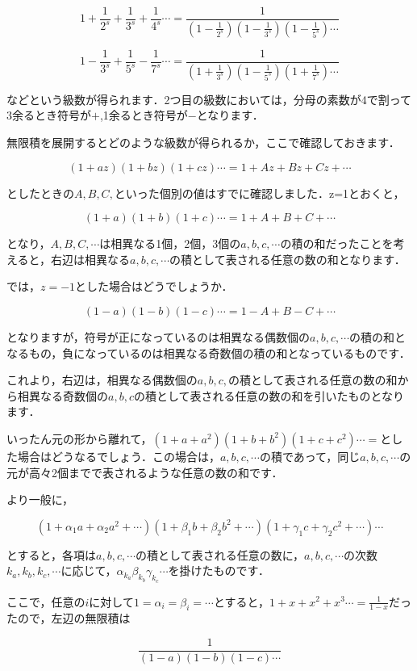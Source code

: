 \documentclass[./main]{subfiles}
\theoremstyle{break}
\begin{document}
\[1+\frac{1}{2^s}+\frac{1}{3^s}+\frac{1}{4^s}\cdots =\frac{1}{\left( 1-\frac{1}{2^s} \right)\left( 1-\frac{1}{3^s} \right)\left( 1-\frac{1}{5^s} \right)\cdots}\]

\[1-\frac{1}{3^s}+\frac{1}{5^s}-\frac{1}{7^s}\cdots =\frac{1}{\left( 1+\frac{1}{3^s} \right)\left( 1-\frac{1}{5^s} \right)\left( 1+\frac{1}{7^s} \right)\cdots}\]

などという級数が得られます．2つ目の級数においては，分母の素数が4で割って3余るとき符号が$+$,1余るとき符号が$-$となります．

無限積を展開するとどのような級数が得られるか，ここで確認しておきます．

\[(1+az)(1+bz)(1+cz)\cdots=1+Az+Bz+Cz+\cdots\]

としたときの$A,B,C,$といった個別の値はすでに確認しました．z=1とおくと，

\[(1+a)(1+b)(1+c)\cdots=1+A+B+C+\cdots\]

となり，$A,B,C,\cdots$は相異なる1個，2個，3個の$a,b,c,\cdots$の積の和だったことを考えると，右辺は相異なる$a,b,c,\cdots$の積として表される任意の数の和となります．

では，$z=-1$とした場合はどうでしょうか．

\[(1-a)(1-b)(1-c)\cdots=1-A+B-C+\cdots\]

となりますが，符号が正になっているのは相異なる偶数個の$a,b,c,\cdots$の積の和となるもの，負になっているのは相異なる奇数個の積の和となっているものです．

これより，右辺は，相異なる偶数個の$a,b,c,$の積として表される任意の数の和から相異なる奇数個の$a,b,c$の積として表される任意の数の和を引いたものとなります．

いったん元の形から離れて，$(1+a+a^2)(1+b+b^2)(1+c+c^2)\cdots=$とした場合はどうなるでしょう．この場合は，$a,b,c,\cdots$の積であって，同じ$a,b,c,\cdots$の元が高々2個までで表されるような任意の数の和です．

より一般に，

\[(1+\alpha_1a+\alpha_2a^2+\cdots)(1+\beta_1b+\beta_2b^2+\cdots)(1+\gamma_1c+\gamma_2c^2+\cdots)\cdots\]

とすると，各項は$a,b,c,\cdots$の積として表される任意の数に，$a,b,c,\cdots$の次数$k_a,k_b,k_c,\cdots$に応じて，$\alpha_{k_a}\beta_{k_b}\gamma_{k_c}\cdots$を掛けたものです．

ここで，任意の$i$に対して$1=\alpha_i=\beta_i=\cdots$とすると，$1+x+x^2+x^3\cdots=\frac{1}{1-x}$だったので，左辺の無限積は

\[\frac{1}{(1-a)(1-b)(1-c)\cdots}\]
\end{document}
